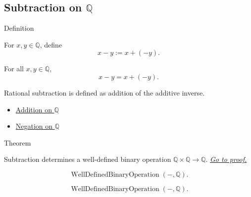 \subsection*{\texorpdfstring{Subtraction on $\mathbb{Q}$}{Subtraction on Q}}

\begin{definitionbox}{Definition}
\begin{definition}
\label{def:subtraction-on-q}
For $x,y\in\mathbb{Q}$, define
\[
x-y:=x+(-y).
\]
\end{definition}
\end{definitionbox}

\begin{remark*}
For all $x,y\in\mathbb{Q}$,
\[
x-y=x+(-y).
\]
\end{remark*}

\begin{remark*}[Interpretation]
Rational subtraction is defined as addition of the additive inverse.
\end{remark*}

\begin{dependencies}
\begin{itemize}
  \item \hyperref[def:addition-on-q-classes]{Addition on $\mathbb{Q}$}
  \item \hyperref[def:negation-on-q-classes]{Negation on $\mathbb{Q}$}
\end{itemize}
\end{dependencies}

\begin{theorembox}{Theorem}
\begin{theorem}
\label{thm:subtraction-on-q-well-defined}
Subtraction determines a well-defined binary operation
$\mathbb{Q}\times\mathbb{Q}\to\mathbb{Q}$.
\hyperref[prf:subtraction-on-q-well-defined]{\textit{Go to proof.}}
\end{theorem}
\end{theorembox}

\begin{remark*}
\[
\operatorname{WellDefinedBinaryOperation}(-,\mathbb{Q}).
\]
\end{remark*}

\begin{remark*}
\[
\operatorname{WellDefinedBinaryOperation}(-,\mathbb{Q}).
\]
\end{remark*}

